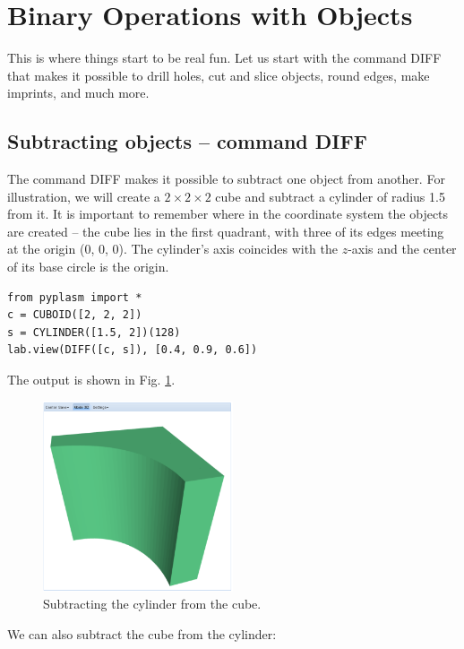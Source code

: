 \documentclass[article,A4,12pt]{llncs}
\begin{document}
\section{Binary Operations with Objects}

This is where things start to be real fun. Let us start with the 
command DIFF that makes it possible to drill holes, cut and slice objects, 
round edges, make imprints, and much more.

\subsection{Subtracting objects -- command DIFF}

The command DIFF makes it possible to subtract one object from another.
For illustration, we will create a $2 \times 2 \times 2$ cube and subtract 
a cylinder of radius 1.5 from it. It is important to remember where in the 
coordinate system the objects are created -- the cube lies in the 
first quadrant, with three of its edges meeting at the origin (0, 0, 0).
The cylinder's axis coincides with the $z$-axis and the center of its base
circle is the origin. 

\begin{verbatim}
from pyplasm import *
c = CUBOID([2, 2, 2])
s = CYLINDER([1.5, 2])(128)
lab.view(DIFF([c, s]), [0.4, 0.9, 0.6]) 
\end{verbatim}
The output is shown in Fig. \ref{fig:diff-1}.

\newpage

\begin{figure}[!ht]
\begin{center}
\includegraphics[width=0.5\textwidth]{img/diff-1.png}
\end{center}
\vspace{-2mm}
\caption{Subtracting the cylinder from the cube.}
\label{fig:diff-1}
\end{figure}
\noindent
We can also subtract the cube from the cylinder:
\end{document}
